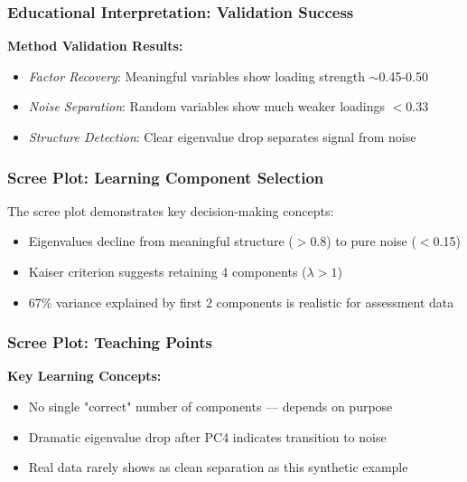 \documentclass[aspectratio=169]{beamer}
\begin{document}
\begin{frame}
    \frametitle{Educational Interpretation: Validation Success}
    \textbf{Method Validation Results:}
    \begin{itemize}
        \item \textit{Factor Recovery}: Meaningful variables show loading strength $\sim$0.45-0.50 \pause
        \item \textit{Noise Separation}: Random variables show much weaker loadings $<$0.33 \pause
        \item \textit{Structure Detection}: Clear eigenvalue drop separates signal from noise \pause
    \end{itemize}
\end{frame}

\begin{frame}
    \frametitle{Scree Plot: Learning Component Selection}
    The scree plot demonstrates key decision-making concepts:
    \begin{itemize}
        \item Eigenvalues decline from meaningful structure ($>$0.8) to pure noise ($<$0.15) \pause
        \item Kaiser criterion suggests retaining 4 components ($\lambda > 1$) \pause
        \item 67\% variance explained by first 2 components is realistic for assessment data \pause
    \end{itemize}
\end{frame}

\begin{frame}
    \frametitle{Scree Plot: Teaching Points}
    \textbf{Key Learning Concepts:}
    \begin{itemize}
        \item No single "correct" number of components — depends on purpose \pause
        \item Dramatic eigenvalue drop after PC4 indicates transition to noise \pause
        \item Real data rarely shows as clean separation as this synthetic example \pause
    \end{itemize}
\end{frame}
\end{document}
